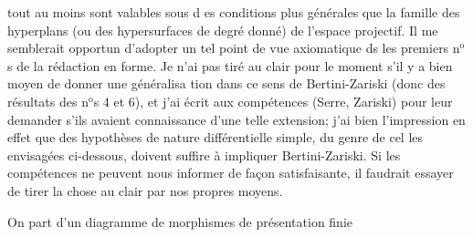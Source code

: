 
tout au moins sont valables sous d es conditions plus générales que  la
famille des hyperplans (ou des hypersurfaces de degré donné) de l'espace
projectif. Il me semblerait opportun d'adopter un tel point de vue
axiomatique ds les premiers n$^{\text{o}}$s de la rédaction en forme. Je n'ai pas
tiré au clair pour le moment s'il y a bien moyen de donner une généralisa%
tion dans ce sens de Bertini-Zariski (donc des résultats des n$^{\text{o}}$s 4 et 6),
et j'ai écrit aux compétences (Serre, Zariski) pour leur demander s'ils
avaient connaissance d'une telle extension; j'ai bien l'impression en
effet que des hypothèses de nature différentielle simple, du genre de cel
les envisagées ci-dessous, doivent suffire à impliquer Bertini-Zariski.
Si les compétences ne peuvent nous informer de façon satisfaisante, il
faudrait essayer de tirer la chose au clair par nos propres moyens.

On part d'un diagramme  de morphismes de présentation finie


